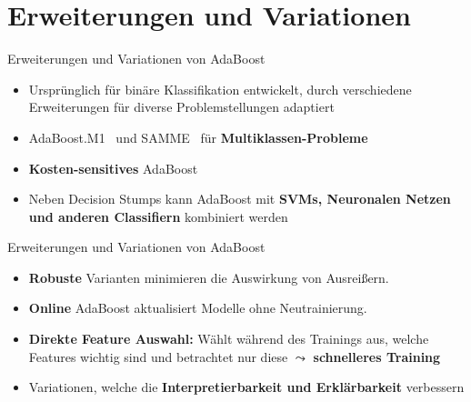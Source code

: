 \documentclass[hyperref={bookmarks=false},11pt,dvipsnames]{beamer}
\begin{document}
\section{Erweiterungen und Variationen}
\begin{frame}{Erweiterungen und Variationen von AdaBoost}
	\begin{itemize}
		\item <1-> Ursprünglich für binäre Klassifikation entwickelt,
		      durch verschiedene Erweiterungen für diverse Problemstellungen adaptiert
		\item <2-> \glqq AdaBoost.M1\grqq~ und \glqq SAMME\grqq~ für \textbf{Multiklassen-Probleme}
		\item <3-> \textbf{Kosten-sensitives} AdaBoost
		\item <4-> Neben Decision Stumps kann AdaBoost mit \textbf{SVMs, Neuronalen Netzen und anderen Classifiern} kombiniert werden

	\end{itemize}
\end{frame}

\begin{frame}{Erweiterungen und Variationen von AdaBoost}
	\begin{itemize}
		\item <1-> \textbf{Robuste} Varianten minimieren die Auswirkung von Ausreißern.
		\item <2-> \textbf{Online} AdaBoost aktualisiert Modelle ohne Neutrainierung.
		\item <3-> \textbf{Direkte Feature Auswahl:} Wählt während des Trainings aus, welche Features wichtig sind
		      und betrachtet nur diese $\leadsto$ \textbf{schnelleres Training}
		\item <4-> Variationen, welche die \textbf{Interpretierbarkeit und Erklärbarkeit} verbessern
	\end{itemize}
\end{frame}
\end{document}

